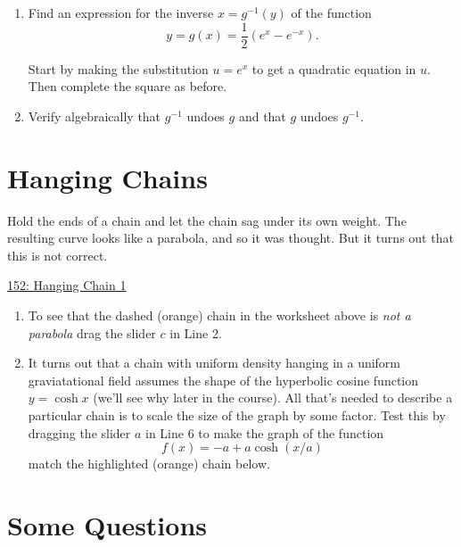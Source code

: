 \documentclass{ximera}
\begin{document}
\begin{question}
\begin{enumerate}
\item Find an expression for the inverse $x =g^{-1}(y)$ of the function
\[
   y= g(x) = \frac{1}{2}\left( e^x - e^{-x} \right).
\]

Start by making the substitution $u=e^x$ to get a quadratic equation in $u$. Then complete the square as before.

\item Verify algebraically that $g^{-1}$ undoes $g$ and that $g$ undoes $g^{-1}$.


\end{enumerate}

\end{question}


\section{Hanging Chains}

Hold the ends of a chain and let the chain sag under its own weight. The resulting curve looks like a parabola, and so it was thought. But it turns out that this is not correct. 


\begin{onlineOnly}
    \begin{center}
\end{center}
\end{onlineOnly}

\href{https://www.desmos.com/calculator/tj3dz2cnf0}{152: Hanging Chain 1}


\begin{enumerate} 

\item To see that the dashed (orange) chain in the worksheet above is \emph{not a parabola} drag the slider $c$ in Line 2.

\item It turns out that a chain with uniform density hanging in a uniform graviatational field assumes the shape of the hyperbolic cosine function $y=\cosh x$ (we'll see why later in the course). All that's needed to describe a particular chain is to scale the size of the graph by some factor. Test this by dragging the slider $a$ in Line 6 to make the graph of the function
\[
     f(x) = -a + a\cosh(x/a)
\]
match the highlighted (orange) chain below.
\end{enumerate}


\section{Some Questions}
\end{document}
